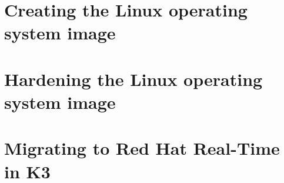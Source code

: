 \documentclass[12pt]{article}
\begin{document}
%
\section{Creating the Linux operating system image}
\label{sec:image_creation}



%
\section{Hardening the Linux operating system image}
\label{sec:image_hardening}



%
\section{Migrating to Red Hat Real-Time in K3}
\label{sec:redhat_migration}
\end{document}
